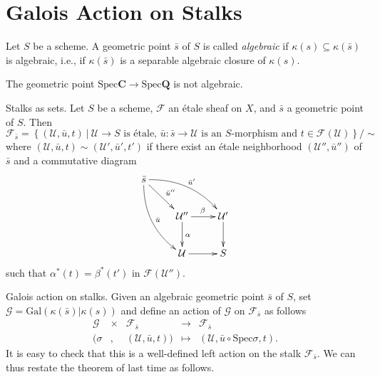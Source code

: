 \section{Galois Action on Stalks}
\label{section-galois-action-stalks}

\begin{definition}
\label{definition-algebraic-geometric-point}
Let $S$ be a scheme. A geometric point $\bar s$ of $S$ is called 
{\it algebraic} if $\kappa(s) \subseteq \kappa(\bar s)$ is
algebraic, i.e., if $\kappa(\bar s)$ is a separable algebraic
closure of $\kappa(s)$.
\end{definition}

\begin{example}
\label{example-stupid}
The geometric point $\text{Spec} \mathbf{C} \to \text{Spec} \mathbf{Q}$ is not 
algebraic.
\end{example}

\noindent
Stalks as sets. Let $S$ be a scheme, $\mathcal{F}$ an
\'etale sheaf on $X$, and $\bar s$ a geometric point of $S$. Then 
$$
\mathcal{F}_{\bar s} = \left\{
(\mathcal{U},\bar u, t) \ \big| \ \mathcal{U} \to S \text{ is \'etale, } \bar u 
: \bar s \to \mathcal{U} \text{ is an $S$-morphism and } t \in 
\mathcal{F}(\mathcal{U})
\right\}
\big/\sim
$$
where $(\mathcal{U},\bar u, t) \sim (\mathcal{U}',\bar u', t')$ if there exist 
an \'etale neighborhood $(\mathcal{U}'',\bar u'')$ of $\bar s$ and a 
commutative diagram
$$
\xymatrix{
\bar s \ar^{\bar u''}[rd] \ar^{\bar u'}@/^1pc/[rrd] \ar^{\bar u}@/_1pc/[rdd] \\
& \mathcal{U}'' \ar^{\beta}[r] \ar^{\alpha}[d] & \mathcal{U}' \ar[d] \\
& \mathcal{U} \ar[r] & S
}
$$
such that $\alpha^*(t) = \beta^*(t')$ in $\mathcal{F}(\mathcal{U}'')$.

\medskip\noindent
Galois action on stalks.
Given an algebraic geometric point $\bar s$ of $S$, set $\mathcal{G} = 
\text{Gal}(\kappa(\bar s) | \kappa(s))$ and define an action of $\mathcal{G}$ 
on $\mathcal{F}_{\bar s}$ as follows
$$
\begin{matrix}
\mathcal{G} & \times & \mathcal{F}_{\bar s} & \longrightarrow & 
\mathcal{F}_{\bar s} \\
(\sigma & , & (\mathcal{U},\bar u, t)) & \longmapsto & (\mathcal{U},\bar u 
\circ \text{Spec} \sigma, t).
\end{matrix}
$$
It is easy to check that this is a well-defined left action on the stalk 
$\mathcal{F}_{\bar s}$. We can thus restate the theorem of last time as follows.

